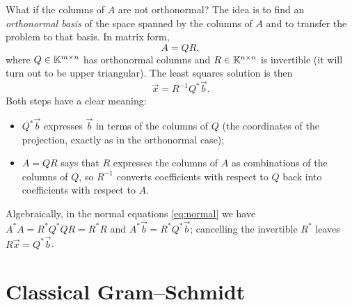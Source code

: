 What if the columns of $A$ are not orthonormal? The idea is to find an \emph{orthonormal basis} of the space spanned by the columns of $A$ and to transfer the problem to that basis. In matrix form,
\begin{equation}
  A = QR,
\end{equation}
where $Q \in \mathbb{K}^{m \times n}$ has orthonormal columns and $R \in \mathbb{K}^{n \times n}$ is invertible (it will turn out to be upper triangular). The least squares solution is then
\begin{equation}
  \vec{x} = R^{-1}Q^\ast\vec{b}.
\end{equation}
Both steps have a clear meaning:
\begin{itemize}
  \item $Q^\ast\vec{b}$ expresses $\vec{b}$ in terms of the columns of $Q$ (the coordinates of the projection, exactly as in the orthonormal case);
  \item $A = QR$ says that $R$ expresses the columns of $A$ as combinations of the columns of $Q$, so $R^{-1}$ converts coefficients with respect to $Q$ back into coefficients with respect to $A$.
\end{itemize}
Algebraically, in the normal equations \eqref{eq:normal} we have $A^\ast A = R^\ast Q^\ast QR = R^\ast R$ and $A^\ast\vec{b} = R^\ast Q^\ast\vec{b}$; cancelling the invertible $R^\ast$ leaves $R\vec{x} = Q^\ast\vec{b}$.

\section{Classical Gram--Schmidt}

